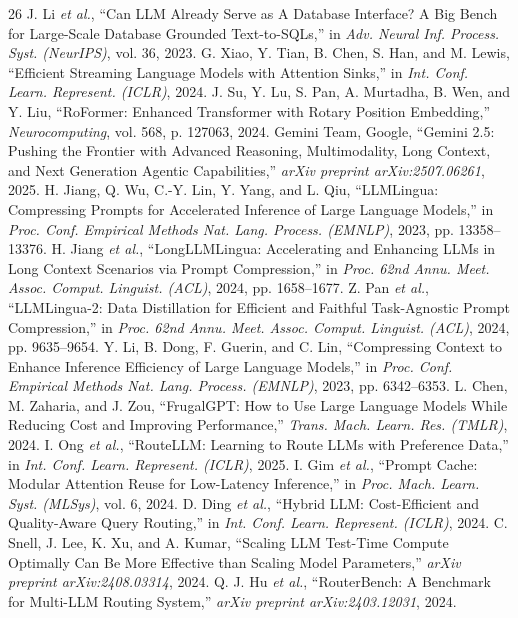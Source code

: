 \documentclass[conference,10pt]{IEEEtran}
\begin{document}
\begin{thebibliography}{26}
 J. Li \emph{et al.}, ``Can LLM Already Serve as A Database Interface? A Big Bench for Large-Scale Database Grounded Text-to-SQLs,'' in \emph{Adv. Neural Inf. Process. Syst. (NeurIPS)}, vol. 36, 2023.
 G. Xiao, Y. Tian, B. Chen, S. Han, and M. Lewis, ``Efficient Streaming Language Models with Attention Sinks,'' in \emph{Int. Conf. Learn. Represent. (ICLR)}, 2024.
 J. Su, Y. Lu, S. Pan, A. Murtadha, B. Wen, and Y. Liu, ``RoFormer: Enhanced Transformer with Rotary Position Embedding,'' \emph{Neurocomputing}, vol. 568, p. 127063, 2024.
 Gemini Team, Google, ``Gemini 2.5: Pushing the Frontier with Advanced Reasoning, Multimodality, Long Context, and Next Generation Agentic Capabilities,'' \emph{arXiv preprint arXiv:2507.06261}, 2025.
 H. Jiang, Q. Wu, C.-Y. Lin, Y. Yang, and L. Qiu, ``LLMLingua: Compressing Prompts for Accelerated Inference of Large Language Models,'' in \emph{Proc. Conf. Empirical Methods Nat. Lang. Process. (EMNLP)}, 2023, pp. 13358--13376.
 H. Jiang \emph{et al.}, ``LongLLMLingua: Accelerating and Enhancing LLMs in Long Context Scenarios via Prompt Compression,'' in \emph{Proc. 62nd Annu. Meet. Assoc. Comput. Linguist. (ACL)}, 2024, pp. 1658--1677.
 Z. Pan \emph{et al.}, ``LLMLingua-2: Data Distillation for Efficient and Faithful Task-Agnostic Prompt Compression,'' in \emph{Proc. 62nd Annu. Meet. Assoc. Comput. Linguist. (ACL)}, 2024, pp. 9635--9654.
 Y. Li, B. Dong, F. Guerin, and C. Lin, ``Compressing Context to Enhance Inference Efficiency of Large Language Models,'' in \emph{Proc. Conf. Empirical Methods Nat. Lang. Process. (EMNLP)}, 2023, pp. 6342--6353.
 L. Chen, M. Zaharia, and J. Zou, ``FrugalGPT: How to Use Large Language Models While Reducing Cost and Improving Performance,'' \emph{Trans. Mach. Learn. Res. (TMLR)}, 2024.
 I. Ong \emph{et al.}, ``RouteLLM: Learning to Route LLMs with Preference Data,'' in \emph{Int. Conf. Learn. Represent. (ICLR)}, 2025.
 I. Gim \emph{et al.}, ``Prompt Cache: Modular Attention Reuse for Low-Latency Inference,'' in \emph{Proc. Mach. Learn. Syst. (MLSys)}, vol. 6, 2024.
 D. Ding \emph{et al.}, ``Hybrid LLM: Cost-Efficient and Quality-Aware Query Routing,'' in \emph{Int. Conf. Learn. Represent. (ICLR)}, 2024.
 C. Snell, J. Lee, K. Xu, and A. Kumar, ``Scaling LLM Test-Time Compute Optimally Can Be More Effective than Scaling Model Parameters,'' \emph{arXiv preprint arXiv:2408.03314}, 2024.
 Q. J. Hu \emph{et al.}, ``RouterBench: A Benchmark for Multi-LLM Routing System,'' \emph{arXiv preprint arXiv:2403.12031}, 2024.
\end{thebibliography}
\end{document}
